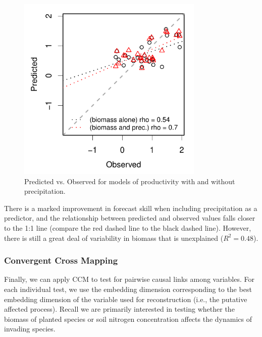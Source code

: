 \documentclass[article]{jss}
\begin{document}
\begin{figure}[t!]
\begin{center}
\includegraphics[width=3.5in]{article-obs-pred-e120}
\end{center}
\caption{\label{fig:obs-pred-e120} Predicted vs. Observed for models of productivity with and without precipitation.}
\end{figure}

There is a marked improvement in forecast skill when including precipitation as a predictor, and the relationship between predicted and observed values falls closer to the 1:1 line (compare the red dashed line to the black dashed line). However, there is still a great deal of variability in biomass that is unexplained ($R^2 = 0.48$).

\subsubsection{Convergent Cross Mapping}\label{sec:convergent-cross-mapping}

Finally, we can apply CCM to test for pairwise causal links among variables. For each individual test, we use the embedding dimension corresponding to the best embedding dimension of the variable used for reconstruction (i.e., the putative affected process). Recall we are primarily interested in testing whether the biomass of planted species or soil nitrogen concentration affects the dynamics of invading species.
\end{document}
